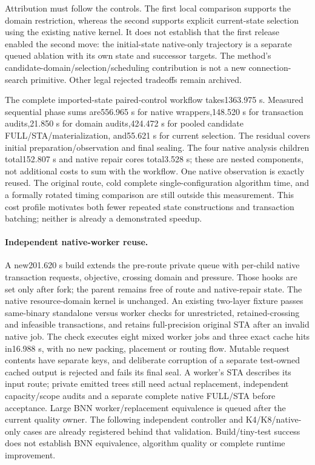Attribution must follow the controls. The first local comparison supports the domain restriction, whereas the second supports explicit current-state selection using the existing native kernel. It does not establish that the first release enabled the second move: the initial-state native-only trajectory is a separate queued ablation with its own state and successor targets. The method's candidate-domain/selection/scheduling contribution is not a new connection-search primitive. Other legal rejected tradeoffs remain archived.

The complete imported-state paired-control workflow takes1363.975 s. Measured sequential phase sums are556.965 s for native wrappers,148.520 s for transaction audits,21.850 s for domain audits,424.472 s for pooled candidate FULL/STA/materialization, and55.621 s for current selection. The residual covers initial preparation/observation and final sealing. The four native analysis children total152.807 s and native repair cores total3.528 s; these are nested components, not additional costs to sum with the workflow. One native observation is exactly reused. The original route, cold complete single-configuration algorithm time, and a formally rotated timing comparison are still outside this measurement. This cost profile motivates both fewer repeated state constructions and transaction batching; neither is already a demonstrated speedup.

\paragraph{Independent native-worker reuse.}
A new201.620 s build extends the pre-route private queue with per-child native transaction requests, objective, crossing domain and pressure. Those hooks are set only after fork; the parent remains free of route and native-repair state. The native resource-domain kernel is unchanged. An existing two-layer fixture passes same-binary standalone versus worker checks for unrestricted, retained-crossing and infeasible transactions, and retains full-precision original STA after an invalid native job. The check executes eight mixed worker jobs and three exact cache hits in16.988 s, with no new packing, placement or routing flow. Mutable request contents have separate keys, and deliberate corruption of a separate test-owned cached output is rejected and fails its final seal. A worker's STA describes its input route; private emitted trees still need actual replacement, independent capacity/scope audits and a separate complete native FULL/STA before acceptance. Large BNN worker/replacement equivalence is queued after the current quality owner. The following independent controller and K4/K8/native-only cases are already registered behind that validation. Build/tiny-test success does not establish BNN equivalence, algorithm quality or complete runtime improvement.

